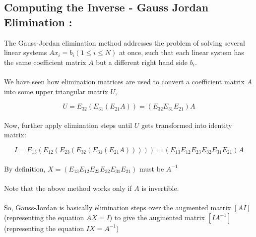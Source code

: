 \documentclass[12pt]{article}
\begin{document}
\subsection{Computing the Inverse - Gauss Jordan Elimination :}

The Gauss-Jordan elimination method addresses the problem of solving several linear systems $Ax_{i} = b_{i}  (1 \leq i \leq N)$ at once, such that each linear system has the same coefficient matrix $A$ but a different right hand side $b_{i}$.
\\\\
We have seen how elimination matrices are used to convert a coefficient matrix $A$ into some upper triangular matrix $U$,

$$U = E_{32}(E_{31}(E_{21}A)) = (E_{32}E_{31}E_{21})A$$
\\
Now, further apply elimination steps until $U$ gets transformed into identity matrix:

$$I = E_{13}(E_{12}(E_{23}(E_{32}(E_{31}(E_{21}A))))) = (E_{13}E_{12}E_{23}E_{32}E_{31}E_{21})A$$
\\
By definition, $X = (E_{13}E_{12}E_{23}E_{32}E_{31}E_{21})$ must be $A^{-1}$
\\ \\
Note that the above method works only if $A$ is invertible.
\\ \\
So, Gauss-Jordan is basically elimination steps over the augmented matrix $[A I]$ (representing the equation $AX = I$) to give the augmented matrix $[I A^{-1}]$ (representing the equation $IX = A^{-1}$)
\end{document}
